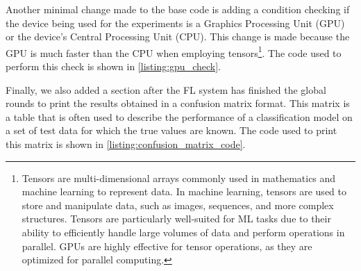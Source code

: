 Another minimal change made to the base code is adding a condition checking if the device being used for the experiments is a Graphics Processing Unit (GPU) or the device's Central Processing Unit (CPU). This change is made because the GPU is much faster than the CPU when employing tensors\footnote{Tensors are multi-dimensional arrays commonly used in mathematics and machine learning to represent data. In machine learning, tensors are used to store and manipulate data, such as images, sequences, and more complex structures. Tensors are particularly well-suited for ML tasks due to their ability to efficiently handle large volumes of data and perform operations in parallel. GPUs are highly effective for tensor operations, as they are optimized for parallel computing.}. The code used to perform this check is shown in \autoref{listing:gpu_check}.


Finally, we also added a section after the FL system has finished the global rounds to print the results obtained in a confusion matrix format. This matrix is a table that is often used to describe the performance of a classification model on a set of test data for which the true values are known. The code used to print this matrix is shown in \autoref{listing:confusion_matrix_code}.


